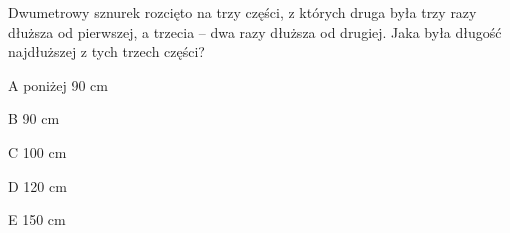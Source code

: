 \begin{tresc}
Dwumetrowy sznurek rozcięto na trzy części, z których druga była trzy razy dłuższa od pierwszej, a trzecia – dwa razy dłuższa od drugiej. Jaka była długość najdłuższej z tych trzech części?
\end{tresc}
\begin{wariant}{A} poniżej 90 cm \end{wariant}
\begin{wariant}{B} 90 cm \end{wariant}
\begin{wariant}{C} 100 cm \end{wariant}
\begin{wariant}{D} 120 cm \end{wariant}
\begin{wariant}{E} 150 cm \end{wariant}
